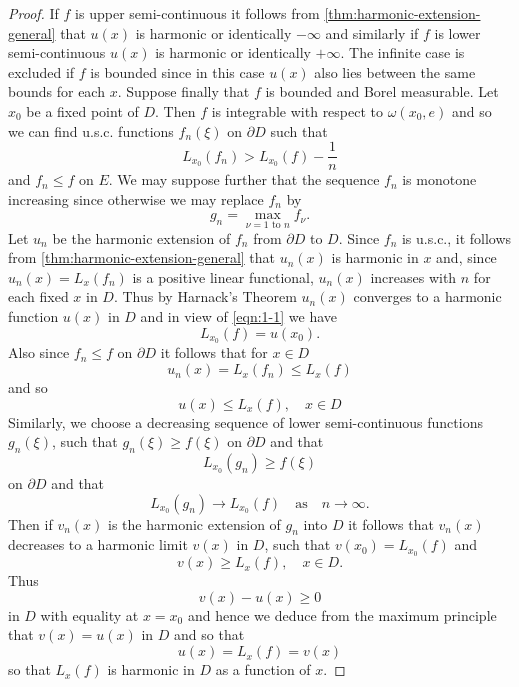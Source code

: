 \begin{proof}
	If $f$ is upper semi-continuous it follows from \cref{thm:harmonic-extension-general} that $u(x)$ is harmonic or identically $-\infty$ and similarly if $f$ is lower semi-continuous $u(x)$ is harmonic or identically $+\infty$. The infinite case is excluded if $f$ is bounded since in this case $u(x)$ also lies between the same bounds for each $x$. Suppose finally that $f$ is bounded and Borel measurable. Let $x_0$ be a fixed point of $D$. Then $f$ is integrable with respect to $\omega(x_0,e)$ and so we can find u.s.c. functions $f_n(\xi)$ on $\partial D$ such that
	\begin{equation}\label{eqn:1-1}
		L_{x_0}(f_n)>L_{x_0}(f)-\frac{1}{n}
	\end{equation}and $f_n\le f$ on $E$. We may suppose further that the sequence $f_n$ is monotone increasing since otherwise we may replace $f_n$ by
	\[
	g_n=\max_{\nu =1 \text{ to } n}f_\nu.
\] Let $u_n$ be the harmonic extension of $f_n$ from $\partial D$ to $D$. Since $f_n$ is u.s.c., it follows from \cref{thm:harmonic-extension-general} that $u_n(x)$ is harmonic in $x$ and, since $u_n(x)=L_x(f_n)$ is a positive linear functional, $u_n(x)$ increases with $n$ for each fixed $x$ in $D$. Thus by Harnack's Theorem $u_n(x)$ converges to a harmonic function $u(x)$ in $D$ and in view of \cref{eqn:1-1} we have 
\[
L_{x_0}(f)=u(x_0).
\] Also since $f_n\le f$ on $\partial D$ it follows that for $x\in D$ 
\[
u_n(x)=L_x(f_n)\le L_x(f)
\] and so
\[
u(x)\le L_x(f),\quad x\in D
\]
Similarly, we choose a decreasing sequence of lower semi-continuous functions $g_n(\xi)$, such that $g_n(\xi)\ge f(\xi)$ on $\partial D$ and that 
\[
L_{x_0}(g_n)\ge f(\xi)
\] on $\partial D$ and that
\[
L_{x_0}(g_n)\to L_{x_0}(f) \quad \text{as}\quad n\to \infty.
\] Then if $v_n(x)$ is the harmonic extension of $g_n$ into $D$ it follows that $v_n(x)$ decreases to a harmonic limit $v(x)$ in $D$, such that $v(x_0)=L_{x_0}(f)$ and 
\[
v(x)\ge L_x(f),\quad x\in D.
\] Thus 
\[
v(x)-u(x)\ge 0
\] in $D$ with equality at $x=x_0$ and hence we deduce from the maximum principle that $v(x)=u(x)$ in $D$ and so that 
\[
u(x)=L_x(f)=v(x)
\] so that $L_x(f)$ is harmonic in $D$ as a function of $x$.
\end{proof}
